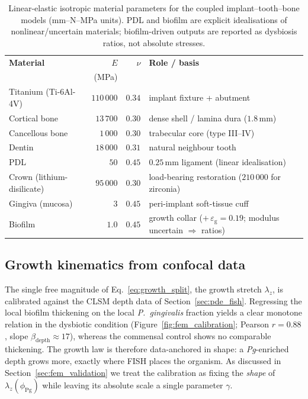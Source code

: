 \begin{table}[htbp]
  \centering\small
  \begin{tabular}{@{}lrrl@{}}
    \toprule
    \textbf{Material} & $E$ & $\nu$ & \textbf{Role / basis}\\
     & (MPa) & & \\
    \midrule
    Titanium (Ti-6Al-4V)        & $110\,000$ & $0.34$ & implant fixture + abutment\\
    Cortical bone               & $13\,700$  & $0.30$ & dense shell / lamina dura ($1.8$\,mm)\\
    Cancellous bone             & $1\,000$   & $0.30$ & trabecular core (type III--IV)\\
    Dentin                      & $18\,000$  & $0.31$ & natural neighbour tooth\\
    PDL                         & $50$       & $0.45$ & $0.25$\,mm ligament (linear idealisation)\\
    Crown (lithium-disilicate)  & $95\,000$  & $0.30$ & load-bearing restoration ($210\,000$ for zirconia)\\
    Gingiva (mucosa)            & $3$        & $0.45$ & peri-implant soft-tissue cuff\\
    Biofilm                     & $1.0$      & $0.45$ & growth collar ($+\,\varepsilon_\mathrm{g}=0.19$; modulus uncertain $\Rightarrow$ ratios)\\
    \bottomrule
  \end{tabular}
  \caption[Finite-element material parameters]{Linear-elastic isotropic material
  parameters for the coupled implant--tooth--bone models (mm--N--MPa units). PDL and
  biofilm are explicit idealisations of nonlinear/uncertain materials; biofilm-driven
  outputs are reported as dysbiosis ratios, not absolute stresses.}
  \label{tab:fem_materials}
\end{table}

\subsection{Growth kinematics from confocal data}
\label{sec:fem_growth}

The single free magnitude of Eq.~\eqref{eq:growth_split}, the growth stretch
$\lambda_z$, is calibrated against the CLSM depth data of
Section~\ref{sec:pde_fish}. Regressing the local biofilm thickening on the local
\textit{P.~gingivalis} fraction yields a clear monotone relation in the dysbiotic
condition (Figure~\ref{fig:fem_calibration}; Pearson $r=0.88$, slope
$\beta_\mathrm{depth}\approx17$), whereas the commensal control shows no comparable
thickening. The growth law is therefore data-anchored in shape: a
\textit{Pg}-enriched depth grows more, exactly where FISH places the organism. As
discussed in Section~\ref{sec:fem_validation} we treat the calibration as fixing the
\emph{shape} of $\lambda_z(\phi_\mathrm{Pg})$ while leaving its absolute scale a
single parameter $\gamma$.

